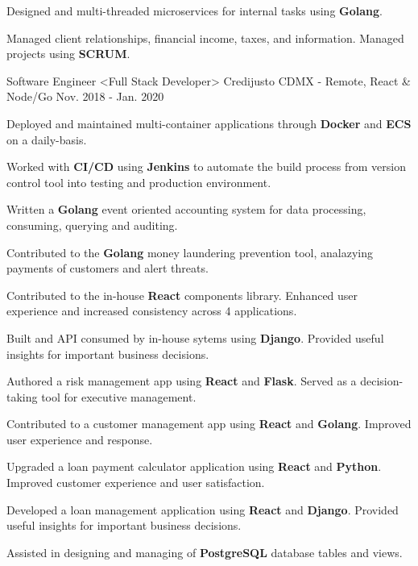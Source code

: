 \begin{cventries}
{\begin{cvitems}
        \item {Designed and multi-threaded microservices for internal tasks using \textbf{Golang}.}
         \item {Managed client relationships, financial income, taxes, and information. Managed projects using \textbf{SCRUM}.}
      \end{cvitems}
    }
  \cventry
    {Software Engineer <Full Stack Developer>}
    {Credijusto}
    {CDMX - Remote, React \& Node/Go}
    {Nov. 2018 - Jan. 2020}
    {
      \begin{cvitems}
        \item {Deployed and maintained multi-container applications through \textbf{Docker} and \textbf{ECS} on a daily-basis.}
        \item {Worked with \textbf{CI/CD} using \textbf{Jenkins} to automate the build process from version control tool into testing and production environment.}
        \item {Written a \textbf{Golang} event oriented accounting system for data processing, consuming, querying and auditing.}
        \item {Contributed to the \textbf{Golang} money laundering prevention tool, analazying payments of customers and alert threats.}
        \item {Contributed to the in-house \textbf{React} components library. Enhanced user experience and increased consistency across 4 applications.}
        \item {Built and API consumed by in-house sytems using \textbf{Django}. Provided useful insights for important business decisions.}
        \item {Authored a risk management app using \textbf{React} and \textbf{Flask}. Served as a decision-taking tool for executive management.}
        \item {Contributed to a customer management app using \textbf{React} and \textbf{Golang}. Improved user experience and response.}
        \item {Upgraded a loan payment calculator application using \textbf{React} and \textbf{Python}. Improved customer experience and user satisfaction.}
        \item {Developed a loan management application using \textbf{React} and \textbf{Django}. Provided useful insights for important business decisions.}
        \item {Assisted in designing and managing of \textbf{PostgreSQL} database tables and views.}
      \end{cvitems}
}
\end{cventries}
